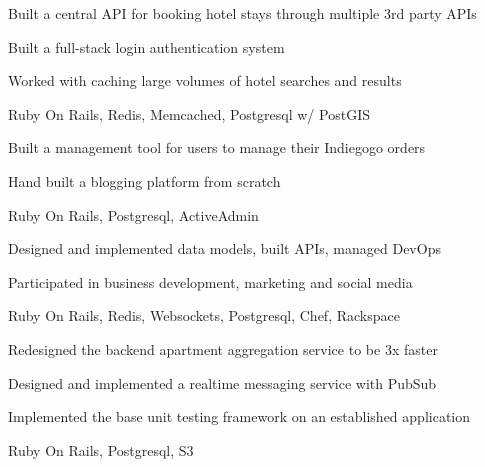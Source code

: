 \documentclass[]{modern}
\begin{document}
\begin{minipage}[t]{0.66\textwidth}

\begin{tightemize}
\item Built a central API for booking hotel stays through multiple 3rd party APIs
\item Built a full-stack login authentication system
\item Worked with caching large volumes of hotel searches and results
\item Ruby On Rails, Redis, Memcached, Postgresql w/ PostGIS
\end{tightemize}
\sectionsep


\begin{tightemize}
\item Built a management tool for users to manage their Indiegogo orders
\item Hand built a blogging platform from scratch
\item Ruby On Rails, Postgresql, ActiveAdmin
\end{tightemize}
\sectionsep


\begin{tightemize}
\item Designed and implemented data models, built APIs, managed DevOps
\item Participated in business development, marketing and social media
\item Ruby On Rails, Redis, Websockets, Postgresql, Chef, Rackspace
\end{tightemize}
\sectionsep


\begin{tightemize}
\item Redesigned the backend apartment aggregation service to be 3x faster
\item Designed and implemented a realtime messaging service with PubSub
\item Implemented the base unit testing framework on an established application
\item Ruby On Rails, Postgresql, S3
\end{tightemize}
\sectionsep


\end{minipage}
\end{document}
